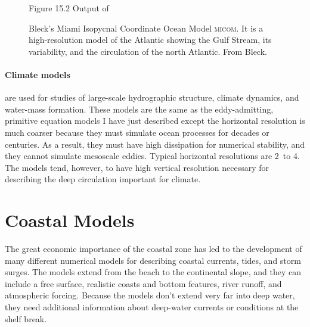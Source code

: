 \begin{figure}[t!]
{} \footnotesize
Figure 15.2 Output of\rule{0mm}{4ex} Bleck's Miami Isopycnal
Coordinate Ocean Model \textsc{micom}. It is a high-resolution model
of the Atlantic showing the Gulf Stream, its variability, and the circulation of
the north Atlantic. From Bleck.
\vspace{-3ex}
\label{fig:blecksgulfstream}
\end{figure}

\paragraph{Climate models}
are used for studies of large-scale hydrographic structure,
climate dynamics, and water-mass formation. These models are the same
as the eddy-admitting, primitive equation models I have just described
except the horizontal resolution is much coarser because they must
simulate ocean processes for decades or centuries. As a result, they
must have high dissipation for numerical stability, and they cannot
simulate mesoscale eddies. Typical horizontal
resolutions are 2\degrees\ to 4\degrees. The models tend, however, to
have high vertical resolution necessary for describing the deep
circulation important for climate.

\section{Coastal Models}
The great economic importance of the
coastal zone has led to the development of many different numerical
models for describing coastal currents, tides, and storm surges. The
models extend from the beach to the continental slope, and they can
include a free surface, realistic coasts and bottom features, river
runoff, and atmospheric forcing.  Because the models don't extend very
far into deep water, they need additional information about deep-water
currents or conditions at the shelf break.

